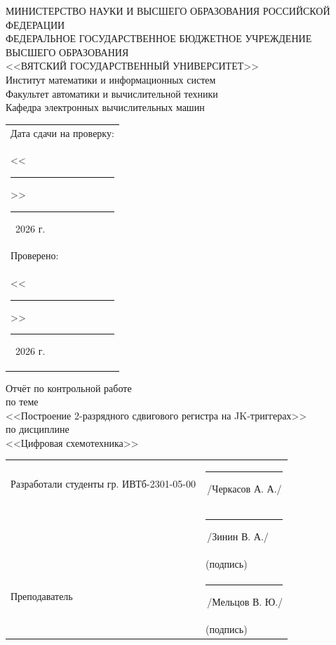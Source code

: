 \documentclass[oneside,a4paper,14pt]{extarticle}
\begin{document}
\newpage
\thispagestyle{empty}
\begin{center}
  МИНИСТЕРСТВО НАУКИ И ВЫСШЕГО ОБРАЗОВАНИЯ РОССИЙСКОЙ ФЕДЕРАЦИИ\\
  ФЕДЕРАЛЬНОЕ ГОСУДАРСТВЕННОЕ БЮДЖЕТНОЕ УЧРЕЖДЕНИЕ ВЫСШЕГО ОБРАЗОВАНИЯ\\
  <<ВЯТСКИЙ ГОСУДАРСТВЕННЫЙ УНИВЕРСИТЕТ>>\\
  Институт математики и информационных систем\\
  Факультет автоматики и вычислительной техники\\
  Кафедра электронных вычислительных машин
\end{center}
\vspace{10mm}

\hfill
\begin{tabular}{l}
  \footnotesize Дата сдачи на проверку:                                          \\
  \footnotesize <<\rule[-1mm]{5mm}{0.10mm}\/>>\rule[-1mm]{20mm}{0.10mm}\ 2026 г. \\
  \footnotesize Проверено:                                                       \\
  \footnotesize <<\rule[-1mm]{5mm}{0.10mm}\/>>\rule[-1mm]{20mm}{0.10mm}\ 2026 г. \\
\end{tabular}
\vfill

\begin{center}
  Отчёт по контрольной работе\\
  по теме\\
  <<Построение 2-разрядного сдвигового регистра на JK-триггерах>>\\
  по дисциплине\\
  <<Цифровая схемотехника>>\\
\end{center}
\vspace{25mm}
\noindent
\begin{tabular}{ll}
  Разработали студенты гр. ИВТб-2301-05-00 & \hspace{5mm}\rule[-1mm]{30mm}{0.10mm}\,/Черкасов А. А./ \\
                                           & \hspace{5mm}\rule[-1mm]{30mm}{0.10mm}\,/Зинин В. А./    \\
                                           & \hspace{12.5mm}\footnotesize(подпись)                   \\
  Преподаватель                            & \hspace{5mm}\rule[-1mm]{30mm}{0.10mm}\,/Мельцов В. Ю./  \\
                                           & \hspace{12.5mm}\footnotesize(подпись)                   \\
\end{tabular}
\end{document}
